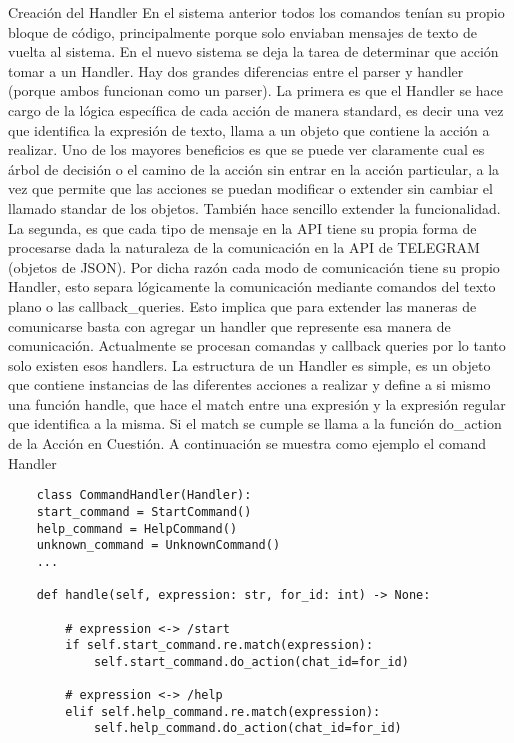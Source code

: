 
    Creación del Handler
    En el sistema anterior todos los comandos tenían su propio bloque de código, principalmente porque solo enviaban mensajes de texto de vuelta al sistema.
    En el nuevo sistema se deja la tarea de determinar que acción tomar a un Handler. Hay dos grandes diferencias entre el parser y handler (porque ambos funcionan como un parser).
    La primera es que el Handler se hace cargo de la lógica específica de cada acción de manera standard, es decir una vez que identifica la expresión de texto, llama a un objeto que contiene la acción a realizar. Uno de los mayores beneficios es que se puede ver claramente cual es árbol de decisión o el camino de la acción sin entrar en la acción particular, a la vez que permite que las acciones se puedan modificar o extender sin cambiar el llamado standar de los objetos. También hace sencillo extender la funcionalidad. 
    La segunda, es que cada tipo de mensaje en la API tiene su propia forma de procesarse dada la naturaleza de la comunicación en la API de TELEGRAM (objetos de JSON). Por dicha razón cada modo de comunicación tiene su propio Handler, esto separa lógicamente la comunicación mediante comandos del texto plano o las callback_queries. Esto implica que para extender las maneras de comunicarse basta con agregar un handler que represente esa manera de comunicación. Actualmente se procesan comandas y callback queries por lo tanto solo existen esos handlers.
    La estructura de un Handler es simple, es un objeto que contiene instancias de las diferentes acciones a realizar y define a si mismo una función handle, que hace el match entre una expresión y la expresión regular que identifica a la misma. Si el match se cumple se llama a la función do_action de la Acción en Cuestión.
    A continuación se muestra como ejemplo el comand Handler

\begin{lstlisting}
    class CommandHandler(Handler):
    start_command = StartCommand()
    help_command = HelpCommand()
    unknown_command = UnknownCommand()
    ...

    def handle(self, expression: str, for_id: int) -> None:

        # expression <-> /start
        if self.start_command.re.match(expression):
            self.start_command.do_action(chat_id=for_id)

        # expression <-> /help
        elif self.help_command.re.match(expression):
            self.help_command.do_action(chat_id=for_id)


\end{lstlisting}


